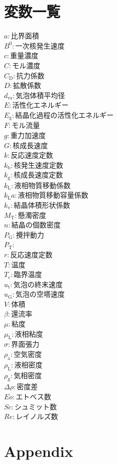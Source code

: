 \chapter*{変数一覧}
\begin{multicols}{2}
\begin{flushleft}
  $a : \text{比界面積}$ \\
  $B^0 : \text{一次核発生速度}$ \\
  $c : \text{重量濃度}$ \\
  $C : \text{モル濃度}$ \\
  $C_\mathrm{D} : \text{抗力係数}$ \\
  $D : \text{拡散係数}$ \\
  $d_\mathrm{vs} : \text{気泡体積平均径}$ \\
  $E : \text{活性化エネルギー}$ \\
  $E_\mathrm{g} : \text{結晶化過程の活性化エネルギー}$ \\
  $F : \text{モル流量}$ \\
  $g : \text{重力加速度}$ \\
  $G : \text{核成長速度}$ \\
  $k : \text{反応速度定数}$ \\
  $k_\mathrm{b} : \text{核発生速度定数}$ \\
  $k_\mathrm{g} : \text{核成長速度定数}$ \\
  $k_\mathrm{L} : \text{液相物質移動係数}$ \\
  $k_\mathrm{L} a : \text{液相物質移動容量係数}$ \\
  $k_\mathrm{v} : \text{結晶体積形状係数}$ \\
  $M_\mathrm{T} : \text{懸濁密度}$ \\
  $n : \text{結晶の個数密度}$ \\
  $P_\mathrm{G} : \text{攪拌動力}$ \\
  $P_\mathrm{T} : \text{}$ \\
  $r : \text{反応速度定数}$ \\
  $T : \text{温度}$ \\
  $T_\mathrm{c} : \text{臨界温度}$ \\
  $u_\mathrm{t} : \text{気泡の終末速度}$ \\
  $u_\mathrm{G} : \text{気泡の空塔速度}$ \\
  $V : \text{体積}$ \\
  $\beta : \text{還流率}$ \\
  $\mu : \text{粘度}$ \\
  $\mu_\mathrm{L} : \text{液相粘度}$ \\
  $\sigma : \text{界面張力}$ \\
  $\rho_\mathrm{a} : \text{空気密度}$ \\
  $\rho_\mathrm{L} : \text{液相密度}$ \\
  $\rho_\mathrm{g} : \text{気相密度}$ \\
  $\varDelta\rho : \text{密度差}$ \\
  $Eo : \text{エトベス数}$ \\
  $Sc : \text{シュミット数}$ \\
  $Re : \text{レイノルズ数}$
\end{flushleft}
\end{multicols}


\chapter*{Appendix}


